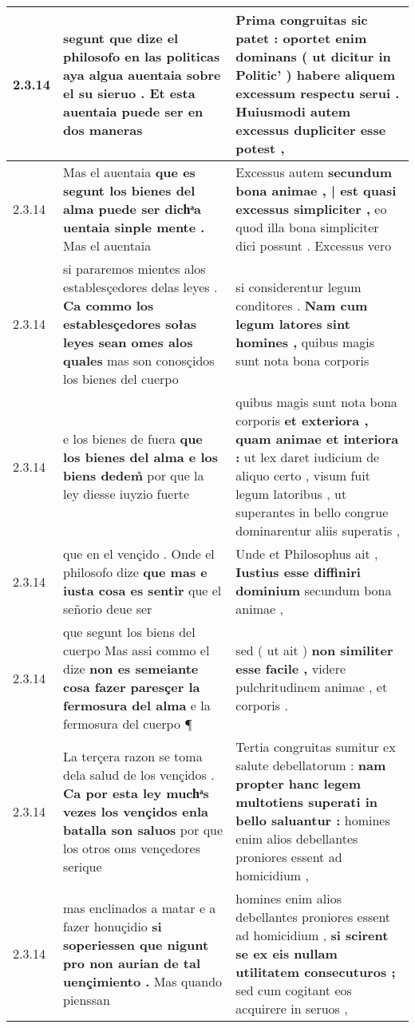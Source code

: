 \begin{tabular}{|p{1cm}|p{6.5cm}|p{6.5cm}|}
2.3.14 & segunt que dize el philosofo en las politicas \textbf{ aya algua auentaia sobre el su sieruo . } Et esta auentaia puede ser en dos maneras & Prima congruitas sic patet : \textbf{ oportet enim dominans ( ut dicitur in Politic’ ) habere aliquem excessum respectu serui . } Huiusmodi autem excessus dupliciter esse potest , \\\hline
2.3.14 & Mas el auentaia \textbf{ que es segunt los bienes del alma puede ser dichͣa uentaia sinple mente . } Mas el auentaia & Excessus autem \textbf{ secundum bona animae , | est quasi excessus simpliciter , } eo quod illa bona simpliciter dici possunt . Excessus vero \\\hline
2.3.14 & si pararemos mientes alos establesçedores delas leyes . \textbf{ Ca commo los establesçedores sołas leyes sean omes alos quales } mas son conosçidos los bienes del cuerpo & si considerentur legum conditores . \textbf{ Nam cum legum latores sint homines , } quibus magis sunt nota bona corporis \\\hline
2.3.14 & e los bienes de fuera \textbf{ que los bienes del alma e los biens dedem̊ } por que la ley diesse iuyzio fuerte & quibus magis sunt nota bona corporis \textbf{ et exteriora , quam animae et interiora : } ut lex daret iudicium de aliquo certo , visum fuit legum latoribus , ut superantes in bello congrue dominarentur aliis superatis , \\\hline
2.3.14 & que en el vençido . Onde el philosofo dize \textbf{ que mas e iusta cosa es sentir } que el señorio deue ser & Unde et Philosophus ait , \textbf{ Iustius esse diffiniri dominium } secundum bona animae , \\\hline
2.3.14 & que segunt los biens del cuerpo Mas assi commo el dize \textbf{ non es semeiante cosa fazer paresçer la fermosura del alma } e la fermosura del cuerpo ¶ & sed ( ut ait ) \textbf{ non similiter esse facile , } videre pulchritudinem animae , et corporis . \\\hline
2.3.14 & La terçera razon se toma dela salud de los vençidos . \textbf{ Ca por esta ley muchͣs vezes los vençidos enla batalla son saluos } por que los otros oms vençedores serique & Tertia congruitas sumitur ex salute debellatorum : \textbf{ nam propter hanc legem multotiens superati in bello saluantur : } homines enim alios debellantes proniores essent ad homicidium , \\\hline
2.3.14 & mas enclinados a matar e a fazer honuçidio \textbf{ si soperiessen que nigunt pro non aurian de tal uençimiento . } Mas quando pienssan & homines enim alios debellantes proniores essent ad homicidium , \textbf{ si scirent se ex eis nullam utilitatem consecuturos ; } sed cum cogitant eos acquirere in seruos , \\\hline

\end{tabular}
